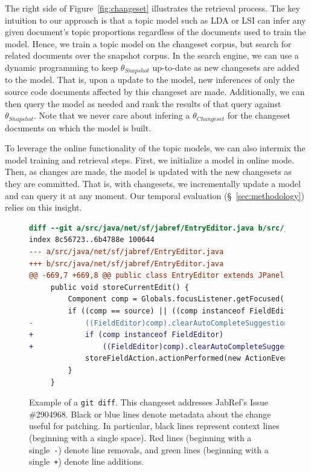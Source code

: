 The right side of Figure~\ref{fig:changeset} illustrates the retrieval process.
The key intuition to our approach is that a topic model such as LDA or LSI
can infer any given document's topic proportions regardless of the documents used to train the model.
Hence, we train a topic model on the changeset corpus,
but search for related documents over the snapshot corpus.
In the search engine, we can use a dynamic programming to
keep $\theta_{Snapshot}$ up-to-date as new changesets are added to the model.
That is, upon a update to the model, new inferences of only the source code documents affected by this changeset are made.
Additionally, we can then query the model as needed
and rank the results of that query against $\theta_{Snapshot}$.
Note that we never care about infering a $\theta_{Changeset}$
for the changeset documents on which the model is built.

To leverage the online functionality of the topic models,
we can also intermix the model training and retrieval steps.
First, we initialize a model in online mode.
Then, as changes are made, the model is updated with the new changesets as they are committed.
That is, with changesets, we incrementally update a model and can query it at any moment.
Our temporal evaluation (\S~\ref{sec:methodology}) relies on this insight.



\begin{figure}[t]
\centering
\footnotesize
\begin{lstlisting}[language=diff, basicstyle=\ttfamily]
diff --git a/src/java/net/sf/jabref/EntryEditor.java b/src/java/net/sf/jabref/EntryEditor.java
index 8c56723..6b4788e 100644
--- a/src/java/net/sf/jabref/EntryEditor.java
+++ b/src/java/net/sf/jabref/EntryEditor.java
@@ -669,7 +669,8 @@ public class EntryEditor extends JPanel implements VetoableChangeListener {
     public void storeCurrentEdit() {
         Component comp = Globals.focusListener.getFocused();
         if ((comp == source) || ((comp instanceof FieldEditor) && this.isAncestorOf(comp))) {
-            ((FieldEditor)comp).clearAutoCompleteSuggestion();
+            if (comp instanceof FieldEditor)
+                ((FieldEditor)comp).clearAutoCompleteSuggestion();
             storeFieldAction.actionPerformed(new ActionEvent(comp, 0, ""));
         }
     }
\end{lstlisting}
\caption{Example of a \texttt{git diff}.
This changeset addresses JabRef's Issue \#2904968.
Black or blue lines denote metadata about the change useful for patching.
In particular, black lines represent context lines (beginning with a single space).
Red lines (beginning with a single~\texttt{-}) denote line removals,
and green lines (beginning with a single~\texttt{+}) denote line additions.}
\label{fig:diff}
\vspace{-10pt}
\end{figure}
